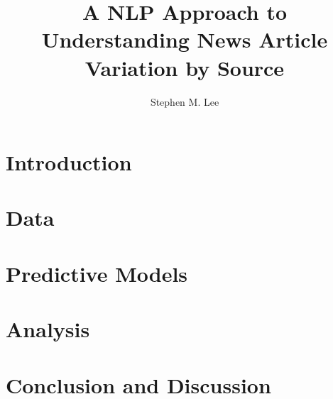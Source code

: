 \documentclass{article}
\author{Stephen M. Lee}
\title{A NLP Approach to Understanding News Article Variation by Source}
\begin{document}
	\maketitle 
	
	\section{Introduction}
	
	\section{Data}
	
	\section{Predictive Models}
	
	\section{Analysis}
	
	\section{Conclusion and Discussion}
	
\end{document}

